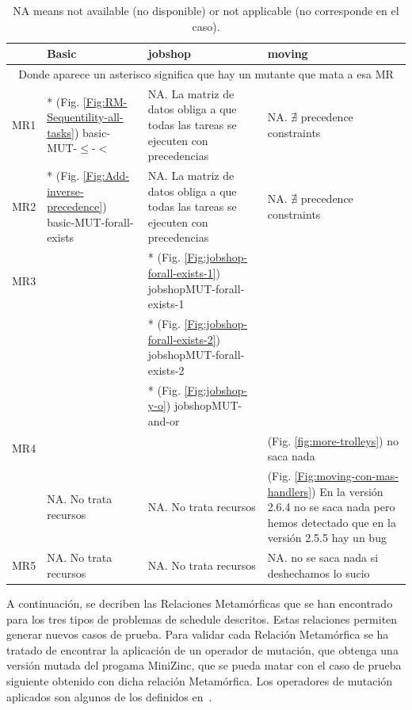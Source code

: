 \begin{table}[t]
\begin{center}
\begin{tabular}{|c|p{3cm}|p{5cm}|p{5cm}|}
\hline
     & Basic & jobshop & moving \\
\hline
\hline
     \multicolumn{4}{|c|}{Donde aparece un asterisco significa que hay un mutante que mata a esa MR} \\
\hline
\hline

MR1 & * (Fig. \ref{Fig:RM-Sequentility-all-tasks}) basic-MUT-$\leq$-$<$  & NA. La matriz de datos obliga a que todas las tareas se ejecuten con precedencias & NA.  $\nexists$ precedence constraints  \\
     \hline
MR2  & * (Fig. \ref{Fig:Add-inverse-precedence}) basic-MUT-forall-exists    & NA. La matriz de datos obliga a que todas las tareas se ejecuten con precedencias & NA.  $\nexists$ precedence constraints\\
     \hline
MR3  &   & * (Fig. \ref{Fig:jobshop-forall-exists-1}) jobshopMUT-forall-exists-1   & \\
     &   & * (Fig. \ref{Fig:jobshop-forall-exists-2}) jobshopMUT-forall-exists-2   & \\
     &   & * (Fig. \ref{Fig:jobshop-y-o}) jobshopMUT-and-or  &   \\
          \hline
MR4   & & & (Fig. \ref{fig:more-trolleys}) no saca nada \\
  & NA. No trata recursos & NA. No trata recursos  &  (Fig. \ref{Fig:moving-con-mas-handlers}) En la versión 2.6.4 no se saca nada  pero hemos detectado que en la versión 2.5.5 hay un bug  \\
     \hline
MR5 & NA. No trata recursos & NA. No trata recursos  & NA. no se saca nada si deshechamos lo sucio \\
     \hline
\end{tabular}
\caption{NA means not available (no disponible) or
not applicable (no corresponde en el caso).}
\end{center}
\end{table}


\newpage








A continuación, se decriben las Relaciones Metamórficas que se han encontrado para los tres tipos de problemas de schedule descritos. Estas relaciones permiten generar nuevos casos de prueba. 
Para validar cada Relación Metamórfica se ha tratado de encontrar la aplicación de un operador de mutación, que obtenga una versión mutada del progama MiniZinc, que se pueda matar con el caso de prueba siguiente obtenido con dicha relación Metamórfica.
Los operadores de mutación aplicados son algunos de los definidos en~\cite{puig2010equivalencias}. 

